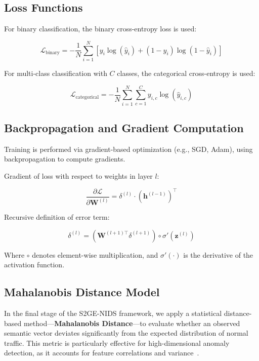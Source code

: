 \begin{ZhChapter}
\subsection{Loss Functions}

For binary classification, the binary cross-entropy loss is used:

\begin{equation}
    \mathcal{L}_{\text{binary}} = - \frac{1}{N} \sum_{i=1}^{N} \left[ y_i \log(\hat{y}_i) + (1 - y_i) \log(1 - \hat{y}_i) \right]
    \label{eq:binary_loss}
\end{equation}

For multi-class classification with $C$ classes, the categorical cross-entropy is used:

\begin{equation}
    \mathcal{L}_{\text{categorical}} = - \frac{1}{N} \sum_{i=1}^{N} \sum_{c=1}^{C} y_{i,c} \log(\hat{y}_{i,c})
    \label{eq:categorical_loss}
\end{equation}

\subsection{Backpropagation and Gradient Computation}

Training is performed via gradient-based optimization (e.g., SGD, Adam), using backpropagation to compute gradients.

Gradient of loss with respect to weights in layer $l$:

\begin{equation}
    \frac{\partial \mathcal{L}}{\partial \mathbf{W}^{(l)}} = \delta^{(l)} \cdot \left( \mathbf{h}^{(l-1)} \right)^\top
    \label{eq:gradient_weight}
\end{equation}

Recursive definition of error term:

\begin{equation}
    \delta^{(l)} = \left( \mathbf{W}^{(l+1)\top} \delta^{(l+1)} \right) \circ \sigma'\left( \mathbf{z}^{(l)} \right)
    \label{eq:delta_recursive}
\end{equation}

Where $\circ$ denotes element-wise multiplication, and $\sigma'(\cdot)$ is the derivative of the activation function.


\subsection{Mahalanobis Distance Model}
In the final stage of the S2GE-NIDS framework, we apply a statistical distance-based method—\textbf{Mahalanobis Distance}—to evaluate whether an observed semantic vector deviates significantly from the expected distribution of normal traffic. This metric is particularly effective for high-dimensional anomaly detection, as it accounts for feature correlations and variance~\cite{de2000mahalanobis}.


\end{ZhChapter}
